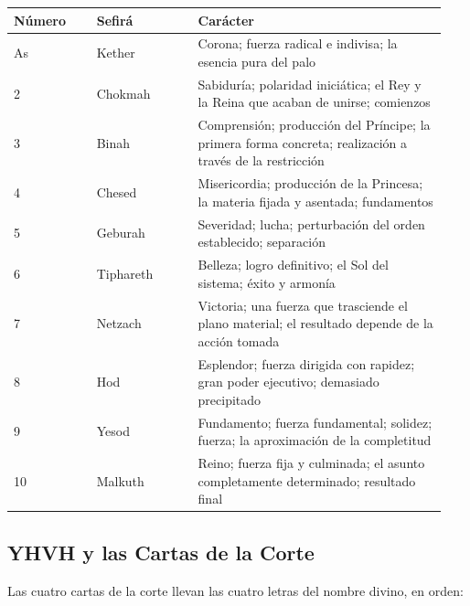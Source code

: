 \begin{longtable}[]{@{}>{\RaggedRight\small}p{0.18\linewidth}>{\RaggedRight\small}p{0.22\linewidth}>{\RaggedRight\small}p{0.54\linewidth}@{}}
\toprule\noalign{}
Número & Sefirá & Carácter \\
\midrule\noalign{}
\endhead
\bottomrule\noalign{}
\endlastfoot
As & Kether & Corona; fuerza radical e indivisa; la esencia pura del palo \\
2 & Chokmah & Sabiduría; polaridad iniciática; el Rey y la Reina que acaban de unirse; comienzos \\
3 & Binah & Comprensión; producción del Príncipe; la primera forma concreta; realización a través de la restricción \\
4 & Chesed & Misericordia; producción de la Princesa; la materia fijada y asentada; fundamentos \\
5 & Geburah & Severidad; lucha; perturbación del orden establecido; separación \\
6 & Tiphareth & Belleza; logro definitivo; el Sol del sistema; éxito y armonía \\
7 & Netzach & Victoria; una fuerza que trasciende el plano material; el resultado depende de la acción tomada \\
8 & Hod & Esplendor; fuerza dirigida con rapidez; gran poder ejecutivo; demasiado precipitado \\
9 & Yesod & Fundamento; fuerza fundamental; solidez; fuerza; la aproximación de la completitud \\
10 & Malkuth & Reino; fuerza fija y culminada; el asunto completamente determinado; resultado final \\
\end{longtable}

\subsection{YHVH y las Cartas de la Corte}\label{yhvh-and-the-court-cards}

Las cuatro cartas de la corte llevan las cuatro letras del nombre divino, en orden:

